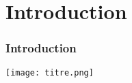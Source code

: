 \section{Introduction}
  \begin{frame}
  \frametitle{Introduction}


\begin{center}
  \texttt{[image: titre.png]}
   \end{center}
  \end{frame}
